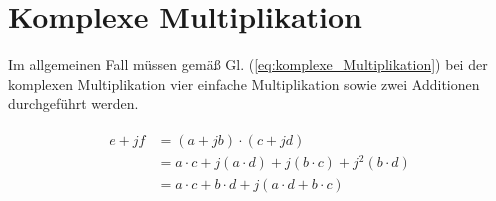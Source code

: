 \section{Komplexe Multiplikation}\label{sec:komplexe_Multiplikation}

Im allgemeinen Fall müssen gemäß Gl. (\ref{eq:komplexe_Multiplikation}) bei der komplexen Multiplikation vier einfache Multiplikation sowie zwei Additionen durchgeführt werden.

\begin{align}\label{eq:komplexe_Multiplikation}
\begin{split}
 e + jf &= (a + jb) \cdot (c + jd)\\
        &= a \cdot c + j(a \cdot d) + j(b \cdot c) + j^2(b \cdot d)\\
        &= a \cdot c + b \cdot d + j(a \cdot d + b \cdot c)
\end{split}
\end{align}


